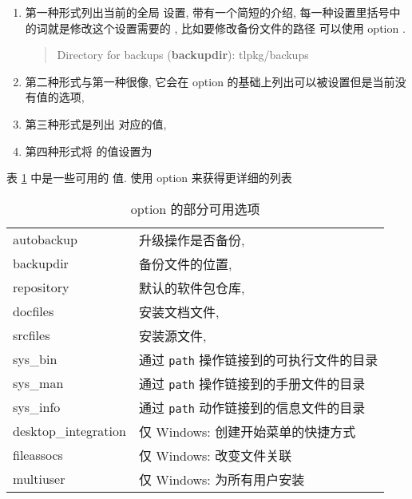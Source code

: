 \begin{enumerate}[(1)]
    \item 第一种形式列出当前的全局 \tl 设置, 带有一个简短的介绍, 每一种设置里括号中的词就是修改这个设置需要的 , 比如要修改备份文件的路径 可以使用 \tlmgr{} \ac{option}  . 
    \begin{quote}
        \ttfamily Directory for backups (\textbf{backupdir}): tlpkg/backups
    \end{quote}
    \item 第二种形式与第一种很像, 它会在 \tlmgr{} \ac{option} 的基础上列出可以被设置但是当前没有值的选项,
    \item 第三种形式是列出  对应的值,
    \item 第四种形式将  的值设置为 
\end{enumerate}

表 \ref{tab:option} 中是一些可用的  值. 使用 \tlmgr{} \ac{option}  来获得更详细的列表 

\begin{table}[!hpb]
    \caption{\tlmgr{} \ac{option} 的部分可用选项}\label{tab:option}
    \begin{center}
        \begin{small}
        \begin{tabular}{>{\ttfamily}ll}
            autobackup & 升级操作是否备份,\\
            backupdir & 备份文件的位置,\\
            repository & 默认的软件包仓库,\\
            docfiles & 安装文档文件,\\
            srcfiles & 安装源文件,\\
            sys\_bin &  通过 \texttt{path} 操作链接到的可执行文件的目录\\
            sys\_man &  通过 \texttt{path} 操作链接到的手册文件的目录\\
            sys\_info&  通过 \texttt{path} 动作链接到的信息文件的目录\\
            desktop\_integration & 仅 Windows: 创建开始菜单的快捷方式\\
            fileassocs&  仅 Windows: 改变文件关联\\
            multiuser & 仅 Windows: 为所有用户安装\\
        \end{tabular}
        \end{small}
    \end{center}
\end{table}


